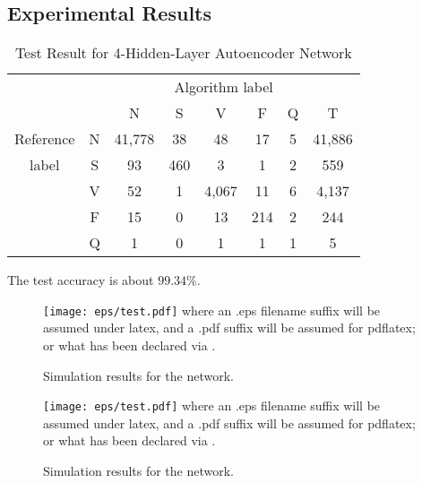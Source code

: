\documentclass[journal]{IEEEtran}
\begin{document}
\subsection{Experimental Results}

\lipsum[1]

\begin{table}[!htbp]
\begin{center}
\begin{threeparttable}
\caption{Test Result for 4-Hidden-Layer Autoencoder Network}
\label{table7}
\begin{tabular}{cccccccc}
\hline
\multicolumn{6}{r}{Algorithm label} \\
\cline{3-7}
		&  & N & S      & V    & F     & Q   & T\\
\hline
 Reference & N & 41,778 &  38  &  48   & 17  & 5  &  41,886 \\
	label  & S &  93    & 460  &   3   & 1   & 2  &  559\\
		   & V &  52    & 1    & 4,067 & 11  & 6  &  4,137\\
		   & F &  15    & 0    & 13    & 214 & 2  &  244\\
		   & Q &  1     & 0    & 1     & 1   & 1  &  5\\
\hline
\end{tabular}
\begin{tablenotes}
\item The test accuracy is about $99.34\%$.
\end{tablenotes}
\end{threeparttable}
\end{center}
\end{table}


\lipsum[2]



\begin{figure}[!htbp]
\centering
\texttt{[image: eps/test.pdf]}
 where an .eps filename suffix will be assumed under latex, 
 and a .pdf suffix will be assumed for pdflatex; or what has been declared
 via \DeclareGraphicsExtensions.
\caption{Simulation results for the network.}
\label{fig_sim}
\end{figure}


\lipsum[1]



\begin{figure}[!htbp]
\centering
\texttt{[image: eps/test.pdf]}
 where an .eps filename suffix will be assumed under latex, 
 and a .pdf suffix will be assumed for pdflatex; or what has been declared
 via \DeclareGraphicsExtensions.
\caption{Simulation results for the network.}
\label{fig_sim}
\end{figure}
\end{document}
